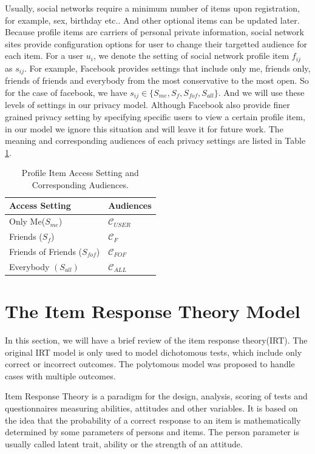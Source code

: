 \documentclass[a4paper]{article}
\begin{document}
Usually, social networks require a minimum number of items upon
registration, for example, sex, birthday etc.. And other optional
items can be updated later. Because profile items are carriers of
personal private information, social network sites provide
configuration options for user to change their targetted audience for
each item. For a user $u_i$, we denote the setting of social network
profile item $f_{ij}$ as $s_{ij}$. For example, Facebook provides
settings that include only me, friends only, friends of friends and
everybody from the most conservative to the most open. So for the case
of facebook, we have $s_{ij}\in \{S_{me},S_f,S_{fof},S_{all}\}$. And
we will use these levels of settings in our privacy model.
Although Facebook also provide finer grained privacy setting by
specifying specific users to view a certain profile item, in our model
we ignore this situation and will leave it for future work. The
meaning and corresponding audiences of each privacy settings are
listed in Table \ref{tbl:setting}.

\begin{table}[h]
  \centering
  \begin{tabular}{l|l}
    \toprule
    \textbf{Access Setting} & \textbf{Audiences} \\ \toprule
    Only Me($S_{me}$) & $\mathcal{C}_{USER}$\\ \midrule
    Friends ($S_f$) & $\mathcal{C}_F$ \\ \midrule
    Friends of Friends ($S_{fof}$) & $\mathcal{C}_{FOF}$ \\ \midrule
    Everybody $(S_{all})$ & $\mathcal{C}_{ALL}$ \\ \bottomrule
  \end{tabular}
  \caption{Profile Item Access Setting and Corresponding Audiences.}
  \label{tbl:setting}
\end{table}

\section{The Item Response Theory Model}
In this section, we will have a brief review of the item response
theory(IRT). The original IRT model is only used to model dichotomous
tests, which include only correct or incorrect outcomes. The
polytomous model was proposed to handle cases with multiple outcomes. 

Item Response Theory is a paradigm for the design, analysis, scoring
of tests and questionnaires measuring abilities, attitudes and other
variables. It is based on the idea that the probability of a correct
response to an item is mathematically determined by some parameters of
persons and items. The person parameter is usually called latent
trait, ability or the strength of an attitude. 
\end{document}
